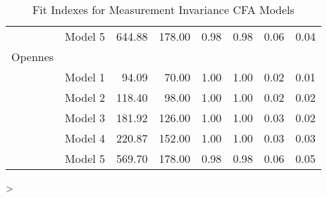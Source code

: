 \begin{table}[ht]
\begin{center}
\begin{tabular}{rrrrrrrr}
 &  Model 5 & 644.88 & 178.00 & 0.98 & 0.98 & 0.06 & 0.04 \\ 
Opennes & & & & & & \\
 & Model 1 & 94.09 & 70.00 & 1.00 & 1.00 & 0.02 & 0.01 \\ 
 &  Model 2 & 118.40 & 98.00 & 1.00 & 1.00 & 0.02 & 0.02 \\ 
 &  Model 3 & 181.92 & 126.00 & 1.00 & 1.00 & 0.03 & 0.02 \\ 
 &  Model 4 & 220.87 & 152.00 & 1.00 & 1.00 & 0.03 & 0.03 \\ 
 &  Model 5 & 569.70 & 178.00 & 0.98 & 0.98 & 0.06 & 0.05 \\ 
   \hline
\end{tabular}
\caption{Fit Indexes for Measurement Invariance CFA Models}
\end{center}
\end{table}
> 